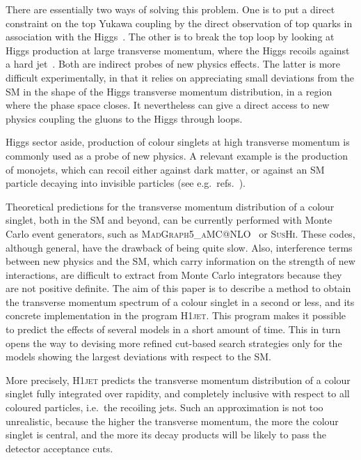\documentclass[12pt]{article}
\begin{document}
There are essentially two ways of solving this problem. One is to put
a direct constraint on the top Yukawa coupling by the direct
observation of top quarks in association with the
Higgs~\cite{Aad:2020ivc,Sirunyan:2020sum,Maltoni:2016yxb}. The other is
to break the top loop by looking at Higgs production at large
transverse momentum, where the Higgs recoils against a hard
jet~\cite{Azatov:2013xha,Grojean:2013nya,Banfi:2013yoa}. Both are
indirect probes of new physics effects. The latter is more difficult
experimentally, in that it relies on appreciating small deviations from
the SM in the shape of the Higgs transverse momentum distribution, in
a region where the phase space closes. It nevertheless can give a
direct access to new physics coupling the gluons to the Higgs through loops.

Higgs sector aside, production of colour singlets at high transverse
momentum is commonly used as a probe of new physics. A relevant
example is the production of monojets, which can recoil
either against dark matter, or against an SM particle decaying into
invisible particles (see e.g.\ refs.~\cite{Sirunyan:2017hci,Aaboud:2019yqu}).

Theoretical predictions for the transverse momentum distribution of a
colour singlet, both in the SM and beyond, can be currently performed
with Monte Carlo event generators, such as
\textsc{\linebreak MadGraph5\_aMC@NLO}~\cite{Alwall:2014hca} or
\textsc{SusHi}\cite{Harlander:2012pb,Harlander:2016hcx}. These codes,
although general, have the drawback of being quite slow. Also,
interference terms between new physics and the SM, which
carry information on the strength of new interactions, are difficult
to extract from Monte Carlo integrators because they are not positive
definite. The aim of this paper is to describe a method to obtain the
transverse momentum spectrum of a colour singlet in a second or less,
and its concrete implementation in the program \textsc{H1jet}. This program
makes it possible to predict the effects of several models in a short
amount of time. This in turn opens the way to devising more refined
cut-based search strategies only for the models showing the largest
deviations with respect to the SM.

More precisely, \textsc{H1jet} predicts the transverse momentum distribution of
a colour singlet fully integrated over rapidity, and completely
inclusive with respect to all coloured particles, i.e.\ the recoiling
jets. Such an approximation is not too unrealistic, because the higher the
transverse momentum, the more the colour singlet is central, and the
more its decay products will be likely to pass the detector acceptance
cuts.
\end{document}
